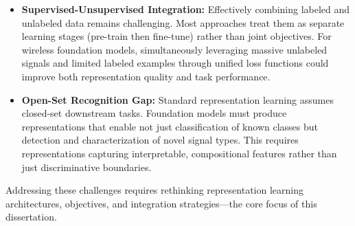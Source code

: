 \begin{itemize}
    \item \textbf{Supervised-Unsupervised Integration:} Effectively combining labeled and unlabeled data remains challenging\cite{}. Most approaches treat them as separate learning stages (pre-train then fine-tune) rather than joint objectives\cite{}. For wireless foundation models, simultaneously leveraging massive unlabeled signals and limited labeled examples through unified loss functions could improve both representation quality and task performance.
    
    \item \textbf{Open-Set Recognition Gap:} Standard representation learning assumes closed-set downstream tasks\cite{}. Foundation models must produce representations that enable not just classification of known classes but detection and characterization of novel signal types\cite{}. This requires representations capturing interpretable, compositional features rather than just discriminative boundaries.
\end{itemize}

Addressing these challenges requires rethinking representation learning architectures, objectives, and integration strategies—the core focus of this dissertation.






